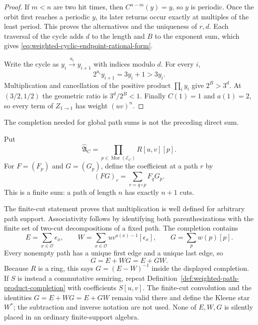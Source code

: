 \begin{proof}
If $m<n$ are two hit times, then $C^{n-m}(y)=y$, so $y$ is periodic.  Once
the orbit first reaches a periodic $y$, its later returns occur exactly at
multiples of the least period.  This proves the alternatives and the
uniqueness of $r,d$.  Each traversal of the cycle adds $d$ to the length and
$B$ to the exponent sum, which gives
\eqref{eq:weighted-cyclic-endpoint-rational-form}.

Write the cycle as $y_i\xrightarrow{a_i}y_{i+1}$ with indices modulo $d$.
For every $i$,
\[
 2^{a_i}y_{i+1}=3y_i+1>3y_i.
\]
Multiplication and cancellation of the positive product $\prod_i y_i$
give $2^B>3^d$.  At $(3/2,1/2)$ the geometric ratio is $3^d/2^B<1$.
Finally $C(1)=1$ and $a(1)=2$, so every term of
$Z_{1\to1}$ has weight $(uv)^n$.
\end{proof}

The completion needed for global path sums is not the preceding direct sum.

\begin{definition}
\label{def:weighted-path-product-completion}
Put
\[
 \widehat{\mathfrak A}_C
  =\prod_{p\in\operatorname{Mor}(\mathcal E_C)}R[u,v][p].
\]
For $F=(F_p)$ and $G=(G_p)$, define the coefficient at a path $r$ by
\[
 (FG)_r=\sum_{r=q\circ p}F_qG_p.
\]
This is a finite sum: a path of length $n$ has exactly $n+1$ cuts.
\end{definition}

The finite-cut statement proves that multiplication is well defined for
arbitrary path support.  Associativity follows by identifying both
parenthesizations with the finite set of two-cut decompositions of a fixed
path.  The completion contains
\[
 E=\sum_{x\in\mathcal O}e_x,
 \qquad
 W=\sum_{x\in\mathcal O}u v^{a(x)-1}[\epsilon_x],
 \qquad
 G=\sum_{p}w(p)[p].
\]
Every nonempty path has a unique first edge and a unique last edge, so
\begin{equation}
\label{eq:weighted-path-resolvent-identities}
 G=E+WG=E+GW.
\end{equation}
Because $R$ is a ring, this says $G=(E-W)^{-1}$ inside the displayed
completion.  If $S$ is instead a commutative semiring, repeat
Definition~\ref{def:weighted-path-product-completion} with coefficients
$S[u,v]$.  The finite-cut convolution and the identities
$G=E+WG=E+GW$ remain valid there and define the Kleene star $W^*$; the
subtraction and inverse notation are not used.  None of $E,W,G$ is silently
placed in an ordinary finite-support algebra.

